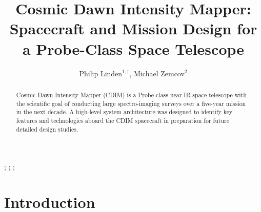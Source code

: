 \documentclass{ws-jai}
\begin{document}
\newcommand{\Ltwo}{L$_2$}
\newcommand{\red}[1]{{\color{red} #1}}

\catchline{}{}{}{}{} %


\title{Cosmic Dawn Intensity Mapper: \\Spacecraft and Mission Design for a Probe-Class Space Telescope}

\author{Philip Linden$^{1,\dagger}$, Michael Zemcov$^{2}$}
\address{
$^{1}$Department of Mechanical Engineering, Kate Gleason College of Engineering, Rochester
Institute of Technology, Rochester, NY 14623, USA, pjl7651@rit.edu\\
$^{2}$Center for Detectors, School of Physics and Astronomy, Rochester
Institute of Technology, Rochester, NY 14623, USA, zemcov@cfd.rit.edu
}

\maketitle


\begin{history}
;
;
;
\end{history}

\begin{abstract}
  Cosmic Dawn Intensity Mapper (CDIM) is a Probe-class near-IR space telescope with the scientific goal of conducting large spectro-imaging surveys over a five-year mission in the next decade.
  A high-level system architecture was designed to identify key features and technologies aboard the CDIM spacecraft in preparation for future detailed design studies.
\end{abstract}



\section{Introduction}
\label{sec:introduction}
\end{document}
